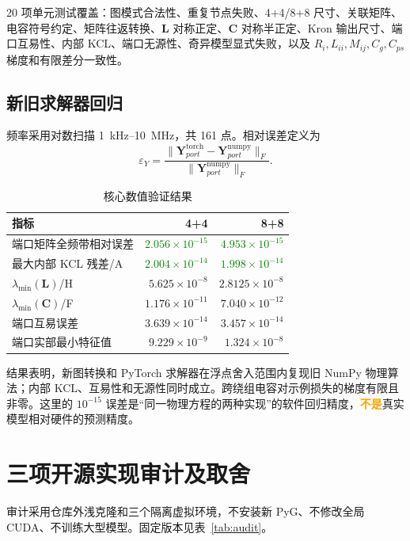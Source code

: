 \documentclass[11pt,a4paper]{ctexart}
\newcommand{\mat}[1]{\bm{#1}}
\newcommand{\result}[1]{\textcolor{green}{\bfseries #1}}
\newcommand{\warning}[1]{\textcolor{orange}{\bfseries #1}}
\begin{document}
20 项单元测试覆盖：图模式合法性、重复节点失败、4+4/8+8 尺寸、关联矩阵、电容符号约定、矩阵往返转换、\(\mat L\) 对称正定、\(\mat C\) 对称半正定、Kron 输出尺寸、端口互易性、内部 KCL、端口无源性、奇异模型显式失败，以及 \(R_i,L_{ii},M_{ij},C_g,C_{ps}\) 梯度和有限差分一致性。

\subsection{新旧求解器回归}

频率采用对数扫描 1~kHz--10~MHz，共 161 点。相对误差定义为
\begin{equation}
\varepsilon_Y=\frac{\|\mat Y_{port}^{\mathrm{torch}}-\mat Y_{port}^{\mathrm{numpy}}\|_F}{\|\mat Y_{port}^{\mathrm{numpy}}\|_F}.
\end{equation}

\begin{table}[H]\centering
\caption{核心数值验证结果}\label{tab:result}
\begin{tabular}{lrr}
\toprule
指标 & 4+4 & 8+8\\
\midrule
端口矩阵全频带相对误差 & \result{$2.056\times10^{-15}$} & \result{$4.953\times10^{-15}$}\\
最大内部 KCL 残差/A & \result{$2.004\times10^{-14}$} & \result{$1.998\times10^{-14}$}\\
$\lambda_{\min}(\mat L)$/H & $5.625\times10^{-8}$ & $2.8125\times10^{-8}$\\
$\lambda_{\min}(\mat C)$/F & $1.176\times10^{-11}$ & $7.040\times10^{-12}$\\
端口互易误差 & $3.639\times10^{-14}$ & $3.457\times10^{-14}$\\
端口实部最小特征值 & $9.229\times10^{-9}$ & $1.324\times10^{-8}$\\
\bottomrule
\end{tabular}
\end{table}

结果表明，新图转换和 PyTorch 求解器在浮点舍入范围内复现旧 NumPy 物理算法；内部 KCL、互易性和无源性同时成立。跨绕组电容对示例损失的梯度有限且非零。这里的 \(10^{-15}\) 误差是“同一物理方程的两种实现”的软件回归精度，\warning{不是}真实模型相对硬件的预测精度。

\section{三项开源实现审计及取舍}

审计采用仓库外浅克隆和三个隔离虚拟环境，不安装新 PyG、不修改全局 CUDA、不训练大型模型。固定版本见表~\ref{tab:audit}。
\end{document}
